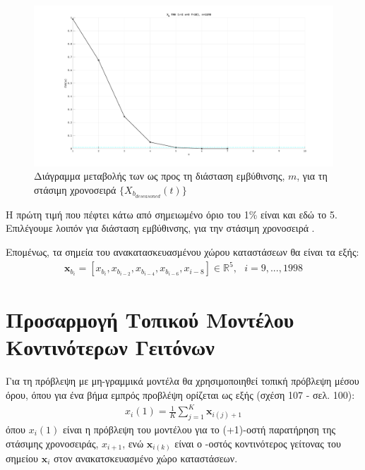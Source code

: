 \begin{figure}[H]
    \begin{center}
        \includegraphics[width=\textwidth]{assets/images/plots/fnn_b.svg.pdf}
        \caption{Διάγραμμα μεταβολής των  ως προς τη διάσταση εμβύθινσης, $m$, για τη στάσιμη χρονοσειρά $\{X_{b_{deseasoned}}(t)\}$}
        \label{fig:fnn_b}
    \end{center}
\end{figure}

Η πρώτη τιμή που πέφτει κάτω από σημειωμένο όριο του 1\% είναι και εδώ το 5. Επιλέγουμε λοιπόν για διάσταση εμβύθινσης, \textbf{} για την στάσιμη χρονοσειρά .

\par Επομένως, τα σημεία του ανακατασκευασμένου χώρου καταστάσεων θα είναι τα εξής:
\begin{align}
    \mathbf{x}_{b_i} = \left[x_{b_i}, x_{b_{i-2}}, x_{b_{i-4}}, x_{b_{i-6}}, x_{i-8}\right] \in \mathbb{R}^5, \ \ \ i=9,...,1998
\end{align}


\section{Προσαρμογή Τοπικού Μοντέλου Κοντινότερων Γειτόνων}

Για τη πρόβλεψη με μη-γραμμικά μοντέλα θα χρησιμοποιηθεί τοπική πρόβλεψη μέσου όρου, όπου για ένα βήμα εμπρός προβλέψη ορίζεται ως εξής (σχέση 107 - σελ. 100):
\begin{align}
    x_i(1) = \frac{1}{K} \sum_{j=1}^{K} \mathbf{x}_{i(j) + 1}
    \label{eq:x_i_1_knn}
\end{align}
όπου $x_i(1)$ είναι η πρόβλεψη του μοντέλου για το (+1)-οστή παρατήρηση της στάσιμης χρονοσειράς, $x_{i+1}$, ενώ $\mathbf{x}_{i(k)}$ είναι ο -οστός κοντινότερος γείτονας του σημείου $\mathbf{x}_i$ στον ανακατσκευασμένο χώρο καταστάσεων. 

